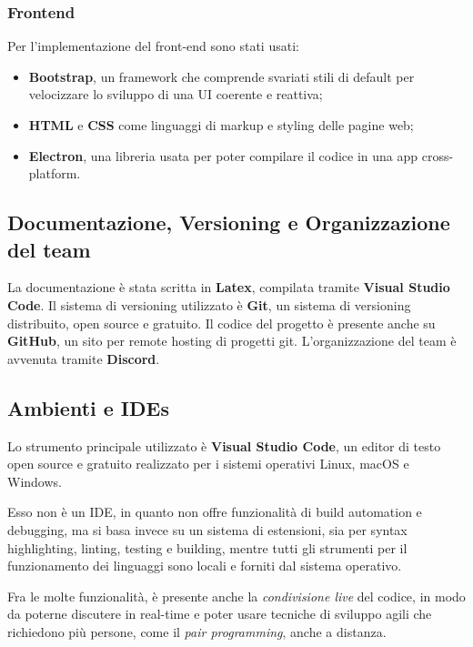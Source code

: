 \subsubsection{Frontend} Per l'implementazione del front-end sono stati usati:
\begin{itemize}
    \item \textbf{Bootstrap}, un framework che comprende svariati stili di default per
    velocizzare lo sviluppo di una UI coerente e reattiva;
    \item \textbf{HTML} e \textbf{CSS} come linguaggi di markup e styling delle pagine web;
    \item \textbf{Electron}, una libreria usata per poter compilare il codice 
     in una app cross-platform.
\end{itemize}

\vspace{5pt}
\subsection{Documentazione, Versioning e Organizzazione del team}
La documentazione è stata scritta in \textbf{Latex}, compilata tramite \textbf{Visual Studio Code}.
Il sistema di versioning utilizzato è \textbf{Git}, un sistema di versioning distribuito,
open source e gratuito. Il codice del progetto è presente anche su \textbf{GitHub}, un sito per remote hosting
di progetti git.
L'organizzazione del team è avvenuta tramite \textbf{Discord}.

\vspace{5pt}
\subsection{Ambienti e IDEs}
Lo strumento principale utilizzato è \textbf{Visual Studio Code}, un editor di
testo open source e gratuito realizzato per i sistemi operativi Linux, macOS
e Windows.

Esso non è un IDE, in quanto non offre funzionalità di build automation
e debugging, ma si basa invece su un sistema di estensioni, sia per syntax
highlighting, linting, testing e building, mentre tutti gli strumenti per il
funzionamento dei linguaggi sono locali e forniti dal sistema operativo.

Fra le molte funzionalità, è presente anche la \textit{condivisione live} del codice, in
modo da poterne discutere in real-time e poter usare tecniche di sviluppo
agili che richiedono più persone, come il \textit{pair programming}, anche a distanza.